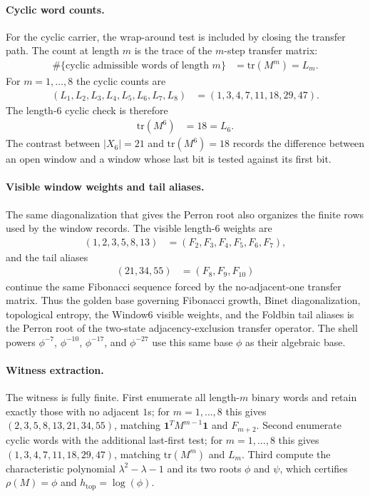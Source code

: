 \paragraph{Cyclic word counts.}
For the cyclic carrier, the wrap-around test is included by closing the transfer path. The count at length $m$ is the trace of the $m$-step transfer matrix:
$$
\begin{aligned}
\#\{\text{cyclic admissible words of length }m\}&=\mathrm{tr}(M^m)=L_m.
\end{aligned}
$$
For $m=1,\ldots,8$ the cyclic counts are
$$
\begin{aligned}
(L_1,L_2,L_3,L_4,L_5,L_6,L_7,L_8)&=(1,3,4,7,11,18,29,47).
\end{aligned}
$$
The length-$6$ cyclic check is therefore
$$
\begin{aligned}
\mathrm{tr}(M^6)&=18=L_6.
\end{aligned}
$$
The contrast between $|X_6|=21$ and $\mathrm{tr}(M^6)=18$ records the difference between an open window and a window whose last bit is tested against its first bit.

\paragraph{Visible window weights and tail aliases.}
The same diagonalization that gives the Perron root also organizes the finite rows used by the window records. The visible length-$6$ weights are
$$
\begin{aligned}
(1,2,3,5,8,13)&=(F_2,F_3,F_4,F_5,F_6,F_7),
\end{aligned}
$$
and the tail aliases
$$
\begin{aligned}
(21,34,55)&=(F_8,F_9,F_{10})
\end{aligned}
$$
continue the same Fibonacci sequence forced by the no-adjacent-one transfer matrix. Thus the golden base governing Fibonacci growth, Binet diagonalization, topological entropy, the Window6 visible weights, and the Foldbin tail aliases is the Perron root of the two-state adjacency-exclusion transfer operator. The shell powers $\phi^{-7}$, $\phi^{-10}$, $\phi^{-17}$, and $\phi^{-27}$ use this same base $\phi$ as their algebraic base.

\paragraph{Witness extraction.}
The witness is fully finite. First enumerate all length-$m$ binary words and retain exactly those with no adjacent $1$s; for $m=1,\ldots,8$ this gives $(2,3,5,8,13,21,34,55)$, matching $\mathbf{1}^{T}M^{m-1}\mathbf{1}$ and $F_{m+2}$. Second enumerate cyclic words with the additional last-first test; for $m=1,\ldots,8$ this gives $(1,3,4,7,11,18,29,47)$, matching $\mathrm{tr}(M^m)$ and $L_m$. Third compute the characteristic polynomial $\lambda^2-\lambda-1$ and its two roots $\phi$ and $\psi$, which certifies $\rho(M)=\phi$ and $h_{\mathrm{top}}=\log(\phi)$.

